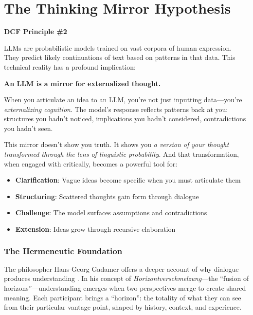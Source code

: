 \chapter{The Thinking Mirror Hypothesis}

\textbf{DCF Principle \#2}

LLMs are probabilistic models trained on vast corpora of human expression. They predict likely continuations of text based on patterns in that data. This technical reality has a profound implication:

\begin{quotebox}
\textbf{An LLM is a mirror for externalized thought.}
\end{quotebox}

When you articulate an idea to an LLM, you're not just inputting data---you're \emph{externalizing cognition}. The model's response reflects patterns back at you: structures you hadn't noticed, implications you hadn't considered, contradictions you hadn't seen.

This mirror doesn't show you truth. It shows you \emph{a version of your thought transformed through the lens of linguistic probability}. And that transformation, when engaged with critically, becomes a powerful tool for:

\begin{itemize}
    \item \textbf{Clarification}: Vague ideas become specific when you must articulate them
    \item \textbf{Structuring}: Scattered thoughts gain form through dialogue
    \item \textbf{Challenge}: The model surfaces assumptions and contradictions
    \item \textbf{Extension}: Ideas grow through recursive elaboration
\end{itemize}

\subsection{The Hermeneutic Foundation}

The philosopher Hans-Georg Gadamer offers a deeper account of why dialogue produces understanding \cite{gadamer1960truth}. In his concept of \emph{Horizontverschmelzung}---the ``fusion of horizons''---understanding emerges when two perspectives merge to create shared meaning. Each participant brings a ``horizon'': the totality of what they can see from their particular vantage point, shaped by history, context, and experience.

